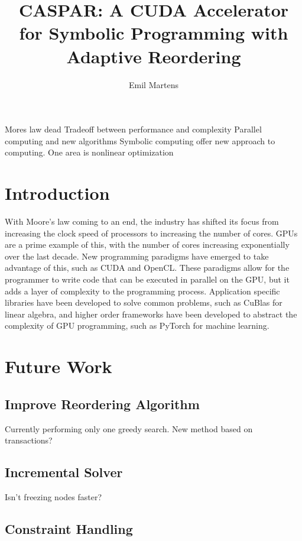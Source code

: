 \documentclass{iopconfser}
\begin{document}
\title{CASPAR: A CUDA Accelerator for Symbolic Programming with Adaptive Reordering}
\author{Emil Martens}

Mores law dead
Tradeoff between performance and complexity
Parallel computing and new algorithms
Symbolic computing offer new approach to computing.
One area is nonlinear optimization

\section{Introduction}

With Moore's law coming to an end, the industry has shifted its focus from increasing the clock speed of processors to increasing the number of cores.
GPUs are a prime example of this, with the number of cores increasing exponentially over the last decade.
New programming paradigms have emerged to take advantage of this, such as CUDA and OpenCL.
These paradigms allow for the programmer to write code that can be executed in parallel on the GPU, but it adds a layer of complexity to the programming process.
Application specific libraries have been developed to solve common problems, such as CuBlas for linear algebra, and higher order frameworks have been developed to abstract the complexity of GPU programming, such as PyTorch for machine learning.








\section{Future Work}

\subsection{Improve Reordering Algorithm}
Currently performing only one greedy search. 
New method based on transactions?

\subsection{Incremental Solver}
Isn't freezing nodes faster?

\subsection{Constraint Handling}



\printbibliography
\end{document}
